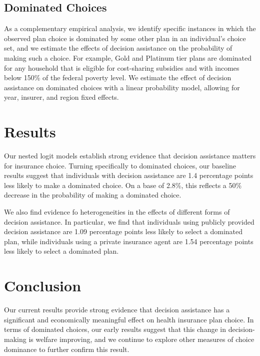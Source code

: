 \documentclass[12pt]{article}
\begin{document}
\subsection{Dominated Choices}
\label{subsec:dominated-choices}

As a complementary empirical analysis, we identify specific instances in which the observed plan choice is dominated by some other plan in an individual's choice set, and we estimate the effects of decision assistance on the probability of making such a choice. For example, Gold and Platinum tier plans are dominated for any household that is eligible for cost-sharing subsidies and with incomes below 150\% of the federal poverty level. We estimate the effect of decision assistance on dominated choices with a linear probability model, allowing for year, insurer, and region fixed effects.

\section{Results}
\label{sec:results}

Our nested logit models establish strong evidence that decision assistance matters for insurance choice. Turning specifically to dominated choices, our baseline results suggest that individuals with decision assistance are 1.4 percentage points less likely to make a dominated choice. On a base of 2.8\%, this reflects a 50\% decrease in the probability of making a dominated choice.

We also find evidence fo heterogeneities in the effects of different forms of decision assistance. In particular, we find that individuals using publicly provided decision assistance are 1.09 percentage points less likely to select a dominated plan, while individuals using a private insurance agent are 1.54 percentage points less likely to select a dominated plan.

\section{Conclusion}
\label{sec:conclusion}

Our current results provide strong evidence that decision assistance has a significant and economically meaningful effect on health insurance plan choice. In terms of dominated choices, our early results suggest that this change in decision-making is welfare improving, and we continue to explore other measures of choice dominance to further confirm this result.
\end{document}
